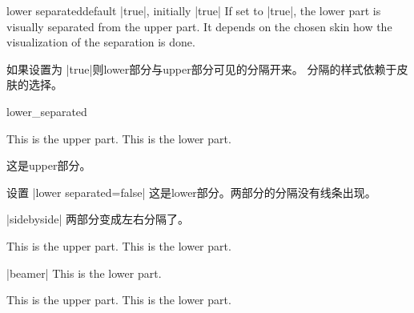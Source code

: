 \begin{docTcbKey}{lower separated}{}{default |true|, initially |true|}
If set to |true|, the lower part is visually separated from the upper part.
It depends on the chosen skin how the visualization of the separation is done.

如果设置为 |true|则lower部分与upper部分可见的分隔开来。
分隔的样式依赖于皮肤的选择。
\enlargethispage*{1cm}
\begin{exdispExample}{lower_separated}
\begin{tcbraster}[colback=red!5!white,colframe=red!75!black,
fonttitle=\bfseries,fontlower=\itshape]
%
\begin{tcolorbox}[title=Lower separated]
This is the upper part.
\tcblower
This is the lower part.
\end{tcolorbox}
%
\begin{tcolorbox}[title=Lower not separated,lower separated=false]
这是upper部分。

设置 |lower separated=false|
\tcblower
这是lower部分。两部分的分隔没有线条出现。
\end{tcolorbox}
%
\begin{tcolorbox}[sidebyside,title=Lower separated]
|sidebyside|
\tcblower
两部分变成左右分隔了。
\end{tcolorbox}
%
\begin{tcolorbox}[sidebyside,title=Lower not separated,lower separated=false]
This is the upper part.
\tcblower
This is the lower part.
\end{tcolorbox}
%
\begin{tcolorbox}[beamer,title=Lower separated]
|beamer|
\tcblower
This is the lower part.
\end{tcolorbox}
%
\begin{tcolorbox}[beamer,title=Lower not separated,lower separated=false]
This is the upper part.
\tcblower
This is the lower part.
\end{tcolorbox}
%
\end{tcbraster}
\end{exdispExample}
\end{docTcbKey}




